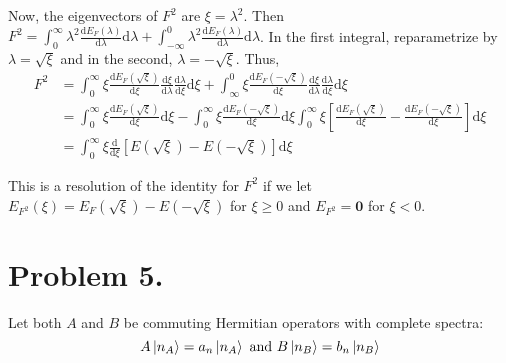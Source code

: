 \documentclass[12pt]{extarticle}
\begin{document}
\begin{enumerate}
Now, the eigenvectors of $F^2$ are $\xi = \lambda^2$. Then $F^2 = \int_{0}^{\infty} \lambda^2 \frac{\mathrm{d} E_F(\lambda)}{\mathrm{d} \lambda} \mathrm{d} \lambda + \int_{-\infty}^{0} \lambda^2 \frac{\mathrm{d} E_F(\lambda)}{\mathrm{d} \lambda} \mathrm{d} \lambda$. In the first integral, reparametrize by $\lambda = \sqrt{\xi}$ and in the second, $\lambda = -\sqrt{\xi}$. Thus, \smallskip
\begin{align*}
F^2 &= \int_{0}^{\infty} \xi \frac{\mathrm{d} E_F(\sqrt{\xi})}{\mathrm{d} \xi} \frac{\mathrm{d} \xi}{\mathrm{d} \lambda} \frac{\mathrm{d} \lambda}{\mathrm{d} \xi} \mathrm{d} \xi + \int_{\infty}^{0} \xi \frac{\mathrm{d} E_F(-\sqrt{\xi})}{\mathrm{d} \xi} \frac{\mathrm{d} \xi}{\mathrm{d} \lambda} \frac{\mathrm{d} \lambda}{\mathrm{d} \xi} \mathrm{d} \xi \\ &=
\int_{0}^{\infty} \xi \frac{\mathrm{d} E_F(\sqrt{\xi})}{\mathrm{d} \xi}  \mathrm{d} \xi - \int_{0}^{\infty} \xi \frac{\mathrm{d} E_F(-\sqrt{\xi})}{\mathrm{d} \xi}  \mathrm{d} \xi \int_{0}^{\infty} \xi  \left[\frac{\mathrm{d} E_F(\sqrt{\xi})}{\mathrm{d} \xi}  - \frac{\mathrm{d} E_F(-\sqrt{\xi})}{\mathrm{d} \xi} \right] \mathrm{d} \xi \\ &= \int_{0}^{\infty} \xi \frac{\mathrm{d}}{\mathrm{d} \xi} \left[ E(\sqrt{\xi}) - E(-\sqrt{\xi}) \right] \mathrm{d} \xi
\end{align*}

This is a resolution of the identity for $F^2$ if we let $E_{F^2}(\xi) = E_F(\sqrt{\xi}) - E(-\sqrt{\xi})$ for $\xi \ge 0$ and $E_{F^2} = \mathbf{0}$ for $\xi < 0$.  
\end{enumerate}

\section*{Problem 5.} Let both $A$ and $B$ be commuting Hermitian operators with complete spectra: 
\[A \left| n_A \right> = a_n\left| n_A \right> \text{ and } B \left| n_B \right> = b_n \left| n_B \right>\]
\end{document}
